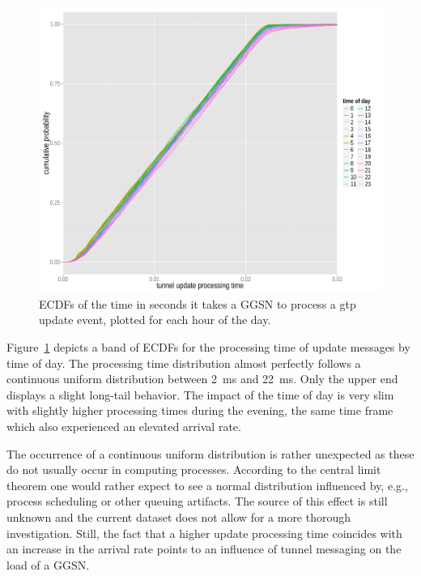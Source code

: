 \begin{figure}[htb]
	\centering
	\includegraphics[width=1.0\textwidth]{images/R-update-time-cdfs.pdf}
	\caption{\glspl{ECDF} of the time in seconds it takes a \gls{GGSN} to process a \gls{gtp} update event, plotted for each hour of the day.}
	\label{c4:fig:update-time}
\end{figure}

Figure~\ref{c4:fig:update-time} depicts a band of \glspl{ECDF} for the processing time of update messages by time of day. The processing time distribution almost perfectly follows a continuous uniform distribution between \SI{2}{\milli\second} and \SI{22}{\milli\second}. Only the upper end displays a slight long-tail behavior. The impact of the time of day is very slim with slightly higher processing times during the evening, the same time frame which also experienced an elevated arrival rate.

The occurrence of a continuous uniform distribution is rather unexpected as these do not usually occur in computing processes. According to the central limit theorem one would rather expect to see a normal distribution influenced by, e.g., process scheduling or other queuing artifacts. The source of this effect is still unknown and the current dataset does not allow for a more thorough investigation. Still, the fact that a higher update processing time coincides with an increase in the arrival rate points to an influence of tunnel messaging on the load of a \gls{GGSN}.



